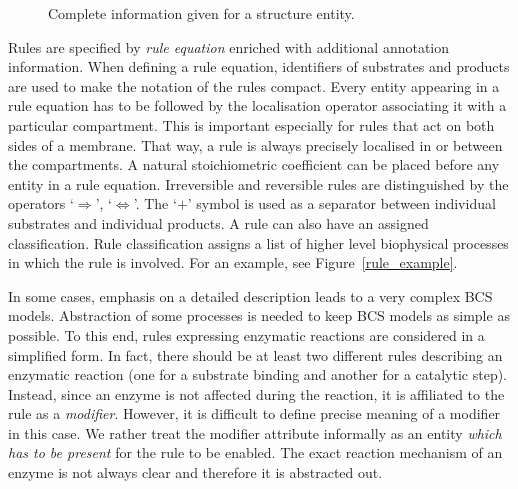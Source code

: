 \documentclass[12pt, twoside]{fithesis2} %
\begin{document}
\begin{figure}[!h]
\begin{center}
\end{center}
\caption{Complete information given for a structure entity.}\label{structure_example}
\end{figure}

Rules are specified by \emph{rule equation} enriched with additional annotation information. When defining a rule equation, identifiers of substrates and products are used to make the notation of the rules compact. Every entity appearing in a rule equation has to be followed by the localisation operator associating it with a particular compartment. This is important especially for rules that act on both sides of a membrane. That way, a rule is always precisely localised in or between the compartments. A natural stoichiometric coefficient can be placed before any entity in a rule equation. Irreversible and reversible rules are distinguished by the operators `$\Rightarrow$', `$\Leftrightarrow$'. The `$+$' symbol is used as a separator between individual substrates and individual products. A rule can also have an assigned classification. Rule classification assigns a list of higher level biophysical processes in which the rule is involved. For an example, see Figure~\ref{rule_example}.

In some cases, emphasis on a detailed description leads to a very complex BCS models. Abstraction of some processes is needed to keep BCS models as simple as possible. To this end, rules expressing enzymatic reactions are considered in a simplified form. In fact, there should be at least two different rules describing an enzymatic reaction (one for a substrate binding and another for a catalytic step). Instead, since an enzyme is not affected during the reaction, it is affiliated to the rule as a \emph{modifier}. However, it is difficult to define precise meaning of a modifier in this case. We rather treat the modifier attribute informally as an entity \emph{which has to be present} for the rule to be enabled. The exact reaction mechanism of an enzyme is not always clear and therefore it is abstracted out.
\end{document}
